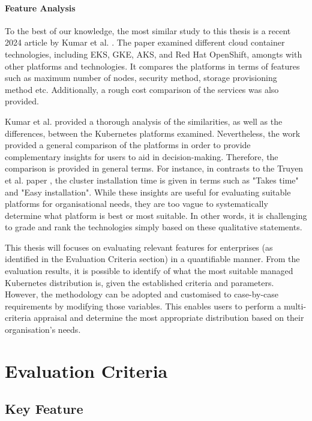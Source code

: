 \subsubsection{Feature Analysis}

To the best of our knowledge, the most similar study to this thesis is a recent 2024 article by Kumar et al. \cite{10499108}. The paper examined different cloud container technologies, including EKS, GKE, AKS, and Red Hat OpenShift, amongts with other platforms and technologies. It compares the platforms in terms of features such as maximum number of nodes, security method, storage provisioning method etc. Additionally, a rough cost comparison of the services was also provided.

Kumar et al. \cite{10499108} provided a thorough analysis of the similarities, as well as the differences, between the Kubernetes platforms examined. Nevertheless, the work provided a general comparison of the platforms in order to provide complementary insights for users to aid in decision-making. Therefore, the comparison is provided in general terms. For instance, in contrasts to the Truyen et al. paper \cite{truyenManagingFeatureCompatibility2020}, the cluster installation time is given in terms such as "Takes time" and "Easy installation". While these insights are useful for evaluating suitable platforms for organisational needs, they are too vague to systematically determine what platform is best or most suitable. In other words, it is challenging to grade and rank the technologies simply based on these qualitative statements.

This thesis will focuses on evaluating relevant features for enterprises (as identified in the Evaluation Criteria section) in a quantifiable manner. From the evaluation results, it is possible to identify of what the most suitable managed Kubernetes distribution is, given the established criteria and parameters. However, the methodology can be adopted and customised to case-by-case requirements by modifying those variables. This enables users to perform a multi-criteria appraisal and determine the most appropriate distribution based on their organisation's needs.

\chapter{Evaluation Criteria}\label{chap:evaluation-criteria}

\section{Key Feature}

